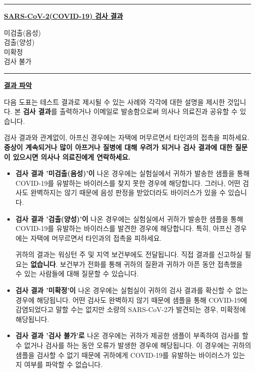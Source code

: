 \documentclass[10pt]{article}
\newcommand{\PageLine}{\rule{\textwidth}{0.25mm}}
\begin{document}
\bigskip
\PageLine

\large \underline{\textbf{SARS-CoV-2(COVID-19) 검사 결과}}

미검출(음성)\\
검출(양성)\\
미확정\\
검사 불가\\

\PageLine
\bigskip

\large \underline{\textbf{결과 파악}}

다음 도표는 테스트 결과로 제시될 수 있는 사례와 각각에 대한 설명을 제시한 것입니다. 본
\textbf{검사 결과}를 출력하거나 이메일로 발송함으로써 의사나 의료진과 공유할 수 있습니다.

검사 결과와 관계없이, 아프신 경우에는 자택에 머무르면서 타인과의 접촉을 피하세요. \textbf{증상이
계속되거나 많이 아프거나 질병에 대해 우려가 되거나 검사 결과에 대한 질문이 있으시면 의사나
의료진에게 연락하세요.}

\begin{itemize}


\item

  \textbf{검사 결과 '미검출(음성)'이} 나온 경우에는 실험실에서 귀하가 발송한 샘플을 통해
  COVID-19를 유발하는 바이러스를 찾지 못한 경우에 해당합니다. 그러나, 어떤 검사도 완벽하지는 않기
  때문에 음성 판정을 받았더라도 바이러스가 있을 수 있습니다.

\item

  \textbf{검사 결과 '검출(양성)'이} 나온 경우에는 실험실에서 귀하가 발송한 샘플을 통해
  COVID-19를 유발하는 바이러스를 발견한 경우에 해당합니다. 특히, 아프신 경우에는 자택에 머무르면서
  타인과의 접촉을 피하세요.

  귀하의 결과는 워싱턴 주 및 지역 보건부에도 전달됩니다. 직접 결과를 신고하실 필요는
  \textbf{없습니다}. 보건부가 전화를 통해 귀하의 질환과 귀하가 아픈 동안 접촉했을 수 있는
  사람들에 대해 질문할 수 있습니다.

\item

  \textbf{검사 결과 '미확정'이} 나온 경우에는 실험실이 귀하의 검사 결과를 확신할 수 없는 경우에
  해당됩니다. 어떤 검사도 완벽하지 않기 때문에 샘플을 통해 COVID-19에 감염되었다고 말할 수는
  없지만 소량의 SARS-CoV-2가 발견되는 경우, 미확정에 해당됩니다.

\item

  \textbf{검사 결과 '검사 불가'로} 나온 경우에는 귀하가 제공한 샘플이 부족하여 검사를 할 수
  없거나 검사를 하는 동안 오류가 발생한 경우에 해당됩니다. 이 경우에는 귀하의 샘플을 검사할 수 없기
  때문에 귀하에게 COVID-19를 유발하는 바이러스가 있는지 여부를 파악할 수 없습니다.

\end{itemize}
\end{document}
